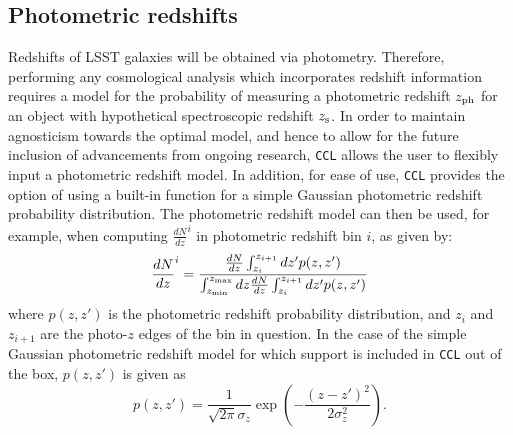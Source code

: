 \documentclass[\docopts]{\docclass}
\newcommand{\ccl}{{\tt CCL}\xspace}
\begin{document}

\subsection{Photometric redshifts}

Redshifts of LSST galaxies will be obtained via photometry. Therefore, performing any cosmological analysis which incorporates redshift information requires a model for the probability of measuring a photometric redshift $z_{\rm ph}$ for an object with hypothetical spectroscopic redshift $z_{\rm s}$.  In order to maintain agnosticism towards the optimal model, and hence to allow for the future inclusion of advancements from ongoing research, \ccl allows the user to flexibly input a photometric redshift model. In addition, for ease of use, \ccl provides the option of using a built-in function for a simple Gaussian photometric redshift probability distribution. The photometric redshift model can then be used, for example, when computing $\frac{dN}{dz}^i$ in photometric redshift bin $i$, as given by:
\begin{equation}
\frac{dN}{dz}^i = \frac{\frac{dN}{dz}\int_{z_i}^{z_{i+1}} dz' p(z,z')}{\int_{z_{\rm min}}^{z_{\rm max}}dz \frac{dN}{dz} \int_{z_i}^{z_{i+1}}dz' p(z, z')}
\label{photoz}
\end{equation}
where $p(z,z')$ is the photometric redshift probability distribution, and $z_{i}$ and $z_{i+1}$ are the photo-$z$ edges of the bin in question. In the case of the simple Gaussian photometric redshift model for which support is included in \ccl out of the box, $p(z, z')$ is given as
\begin{equation}
p(z,z') = \frac{1}{\sqrt{2 \pi}\sigma_z} \exp\left(-\frac{(z-z')^2}{2\sigma_z^2}\right).
\label{pz_gauss}
\end{equation}
\end{document}
